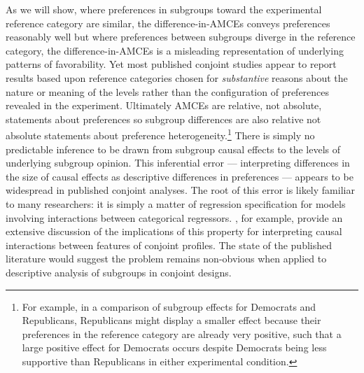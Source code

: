 \documentclass[a4paper,12pt]{article}\usepackage[]{graphicx}\usepackage[]{color}
\begin{document}
As we will show, where preferences in subgroups toward the experimental reference category are similar, the difference-in-AMCEs conveys preferences reasonably well but where preferences between subgroups diverge in the reference category, the difference-in-AMCEs is a misleading representation of underlying patterns of favorability. Yet most published conjoint studies appear to report results based upon reference categories chosen for \textit{substantive} reasons about the nature or meaning of the levels rather than the configuration of preferences revealed in the experiment. Ultimately AMCEs are relative, not absolute, statements about preferences so subgroup differences are also relative not absolute statements about preference heterogeneity.\footnote{For example, in a comparison of subgroup effects for Democrats and Republicans, Republicans might display a smaller effect because their preferences in the reference category are already very positive, such that a large positive effect for Democrats occurs despite Democrats being less supportive than Republicans in either experimental condition.} There is simply no predictable inference to be drawn from subgroup causal effects to the levels of underlying subgroup opinion. This inferential error --- interpreting differences in the size of causal effects as descriptive differences in preferences --- appears to be widespread in published conjoint analyses. The root of this error is likely familiar to many researchers: it is simply a matter of regression specification for models involving interactions between categorical regressors. \citet{EgamiImai2018}, for example, provide an extensive discussion of the implications of this property for interpreting causal interactions between features of conjoint profiles. The state of the published literature would suggest the problem remains non-obvious when applied to descriptive analysis of subgroups in conjoint designs.
\end{document}
